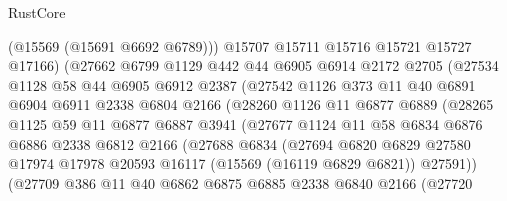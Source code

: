 \begin{lexlean}{RustCore}
\begin{coremodule}
                      (@15569 (@15691 @6692 @6789)))
                    @15707
                    @15711
                    @15716
                    @15721
                    @15727
                    @17166)
                  (@27662
                    @6799
                    @1129
                    @442
                    @44
                    @6905
                    @6914
                    @2172
                    @2705
                    (@27534
                      @1128
                      @58
                      @44
                      @6905
                      @6912
                      @2387
                      (@27542
                        @1126
                        @373
                        @11
                        @40
                        @6891
                        @6904
                        @6911
                        @2338
                        @6804
                        @2166
                        (@28260
                          @1126
                          @11
                          @6877
                          @6889
                          (@28265
                            @1125
                            @59
                            @11
                            @6877
                            @6887
                            @3941
                            (@27677
                              @1124
                              @11
                              @58
                              @6834
                              @6876
                              @6886
                              @2338
                              @6812
                              @2166
                              (@27688
                                @6834
                                (@27694
                                  @6820
                                  @6829
                                  @27580
                                  @17974
                                  @17978
                                  @20593
                                  @16117
                                  (@15569 (@16119 @6829 @6821))
                                  @27591))
                              (@27709
                                @386
                                @11
                                @40
                                @6862
                                @6875
                                @6885
                                @2338
                                @6840
                                @2166
                                (@27720

\end{coremodule}
\end{lexlean}
